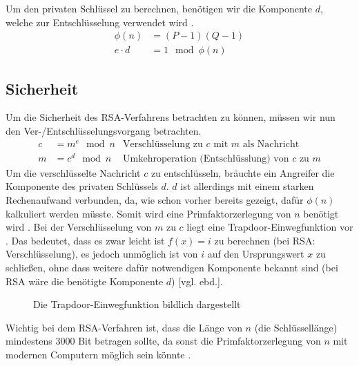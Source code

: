 \documentclass[a4paper,ngerman, headheight=28pt,12pt]{scrartcl}
\newcommand{\vcite}[1]{\cite[vgl.][]{#1}}
\newcommand{\vebd}{[vgl. ebd.]}
\begin{document}
Um den privaten Schlüssel zu berechnen, benötigen wir die Komponente $d$, welche zur Entschlüsselung verwendet wird \vcite{RsaEncryptionDecryption}.
\begin{equation*}
  \begin{aligned}
    \phi(n)   & = (P-1)(Q-1)     \\
    e \cdot d & = 1 \mod \phi(n)
  \end{aligned}
\end{equation*}

\subsection{Sicherheit}
Um die Sicherheit des RSA-Verfahrens betrachten zu können, müssen wir nun den Ver-/Entschlüsselungsvorgang betrachten.
\begin{equation*}
  \begin{aligned}
    c & = m^e \mod n & \text{Verschlüsselung zu $c$ mit $m$ als Nachricht}    \\
    m & = c^d \mod n & \text{Umkehroperation (Entschlüsslung) von $c$ zu $m$}
  \end{aligned}
\end{equation*}
Um die verschlüsselte Nachricht $c$ zu entschlüsseln, bräuchte ein Angreifer die Komponente des privaten Schlüssels $d$. $d$ ist allerdings mit einem starken Rechenaufwand verbunden, da, wie schon vorher bereits gezeigt, dafür $\phi(n)$ kalkuliert werden müsste. Somit wird eine Primfaktorzerlegung von $n$ benötigt wird \vcite{EulersTotientFunction}. Bei der Verschlüsselung von $m$ zu $c$ liegt eine Trapdoor-Einwegfunktion vor \vcite{RsaTrapdoor}. Das bedeutet, dass es zwar leicht ist $f(x) = i$ zu berechnen (bei RSA: Verschlüsselung), es jedoch unmöglich ist von $i$ auf den Ursprungswert $x$ zu schließen, ohne dass weitere dafür notwendigen Komponente bekannt sind (bei RSA wäre die benötigte Komponente $d$) \vebd.
\begin{figure}[h]
  \centering
  
  \caption{Die Trapdoor-Einwegfunktion bildlich dargestellt\vcite{fig:TrapdoorPermutation} \label{fig:TrapdoorFunc}}
\end{figure}

Wichtig bei dem RSA-Verfahren ist, dass die Länge von $n$ (die Schlüssellänge) mindestens 3000 Bit betragen sollte, da sonst die Primfaktorzerlegung von $n$ mit modernen Computern möglich sein könnte \vcite{RsaKeyLength}.

\end{document}
